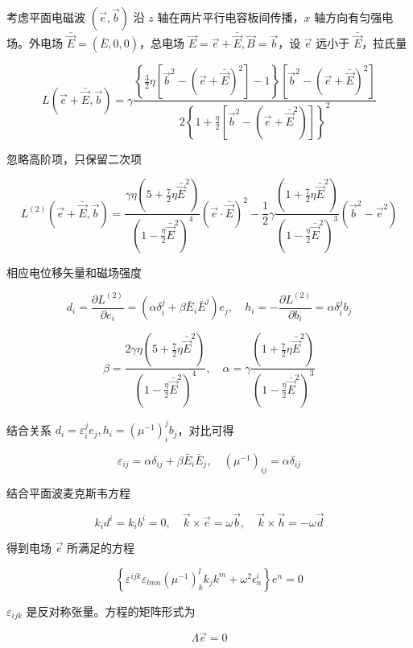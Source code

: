 \documentclass[aps,prl,preprint,groupedaddress]{revtex4-2}
\begin{document}
考虑平面电磁波 $\left(\vec{e},\vec{b}\right) $ 沿 $z $ 轴在两片平行电容板间传播，$x $ 轴方向有匀强电场。外电场 $\bar{\vec{E}}=(\bar{E},0,0) $，总电场 $\vec{E}=\vec{e}+\bar{\vec{E}},\vec{B}=\vec{b} $，设 $\vec{e} $ 远小于 $\bar{\vec{E}} $，拉氏量

$$
L\left(\vec{e}+\bar{\vec{E}},\vec{b} \right)
=\gamma\frac{\left\{\frac{3 }{2 } \eta\left[\vec{b}^2-\left(\vec{e}+\bar{\vec{E}} \right)^2 \right] - 1 \right\}\left[\vec{b}^2-\left(\vec{e}+\bar{\vec{E}} \right)^2 \right] }{2\left\{1+\frac{\eta }{2 } \left[\vec{b}^2-\left(\vec{e} + \bar{\vec{E}}^2 \right) \right] \right\}^2 } 
$$

忽略高阶项，只保留二次项

$$
L^{(2)}(\vec{e}+\bar{\vec{E}},\vec{b})
=\frac{\gamma\eta\left(5+\frac{7 }{2 } \eta \bar{\vec{E}}^2 \right) }{\left(1-\frac{\eta }{2 } \bar{\vec{E}}^2 \right)^4 }\left(\vec{e}\cdot\bar{\vec{E}} \right)^2 - \frac{1 }{2 } \gamma \frac{\left(1+\frac{7 }{2 } \eta \bar{\vec{E}}^2 \right) }{\left(1-\frac{\eta }{2 } \bar{\vec{E}}^2 \right)^3 }\left(\vec{b}^2-\vec{e}^2 \right) 
$$

相应电位移矢量和磁场强度

$$
d_i = \frac{\partial L^{(2)} }{\partial e_i } = \left(\alpha\delta_i^j+\beta\bar{E}_i\bar{E}^j \right)e_j,\quad
h_i
=-\frac{\partial L^{(2)} }{\partial b_i } 
=\alpha\delta_i^j b_j 
$$

$$
\beta = \frac{2\gamma \eta\left(5+\frac{7 }{2 } \eta \bar{\vec{E}}^2 \right) }{\left(1-\frac{\eta }{2 } \bar{\vec{E}}^2 \right)^4 },\quad 
\alpha = \gamma \frac{\left(1+\frac{7 }{2 }\eta\bar{\vec{E}}^2 \right)  }{\left(1-\frac{\eta }{2 } \bar{\vec{E}}^2 \right)^3 }
$$

结合关系 $d_i=\varepsilon_i^j e_j,h_i=\left(\mu^{-1} \right)_i^j b_j $，对比可得
    
$$
\varepsilon_{ij} = \alpha\delta_{ij} + \beta\bar{E}_i\bar{E}_j ,\quad
\left(\mu^{-1} \right)_{ij} = \alpha\delta_{ij} 
$$

结合平面波麦克斯韦方程

$$
k_i d^i = k_i b^i = 0,\quad
\vec{k}\times\vec{e} = \omega\vec{b},\quad
\vec{k}\times\vec{h} = -\omega\vec{d} 
$$

得到电场 $\vec{e}$ 所满足的方程

$$
\left\{\varepsilon^{ijk}\varepsilon_{lmn} \left(\mu^{-1} \right)_k^l k_j k^m+\omega^2\epsilon_n^i \right\}e^n = 0
$$

$\varepsilon_{ijk} $ 是反对称张量。方程的矩阵形式为

$$
\Lambda \vec{e} = 0 
$$
\end{document}
